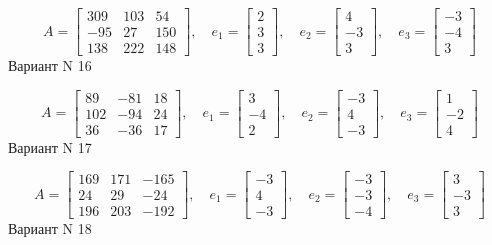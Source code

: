 \documentclass[11pt]{report}
\begin{document}
$$A = \left[\begin{matrix}309 & 103 & 54\\-95 & 27 & 150\\138 & 222 & 148\end{matrix}\right],\quad e_1 = \left[\begin{matrix}2\\3\\3\end{matrix}\right],\quad e_2 = \left[\begin{matrix}4\\-3\\3\end{matrix}\right],\quad e_3 = \left[\begin{matrix}-3\\-4\\3\end{matrix}\right]$$Вариант N 16

$$A = \left[\begin{matrix}89 & -81 & 18\\102 & -94 & 24\\36 & -36 & 17\end{matrix}\right],\quad e_1 = \left[\begin{matrix}3\\-4\\2\end{matrix}\right],\quad e_2 = \left[\begin{matrix}-3\\4\\-3\end{matrix}\right],\quad e_3 = \left[\begin{matrix}1\\-2\\4\end{matrix}\right]$$Вариант N 17

$$A = \left[\begin{matrix}169 & 171 & -165\\24 & 29 & -24\\196 & 203 & -192\end{matrix}\right],\quad e_1 = \left[\begin{matrix}-3\\4\\-3\end{matrix}\right],\quad e_2 = \left[\begin{matrix}-3\\-3\\-4\end{matrix}\right],\quad e_3 = \left[\begin{matrix}3\\-3\\3\end{matrix}\right]$$Вариант N 18
\end{document}
